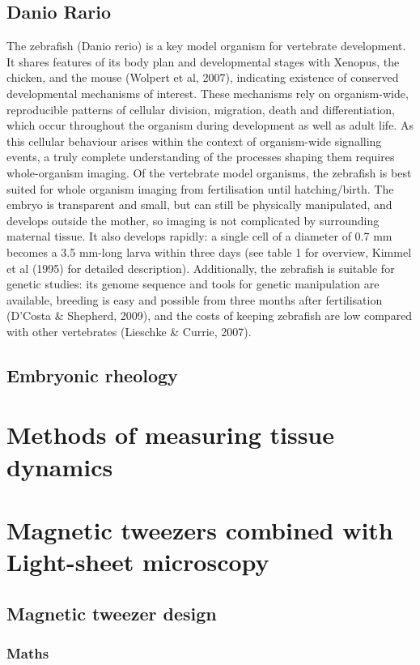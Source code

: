 \subsection{Danio Rario}
The zebrafish (Danio rerio) is a key model organism for vertebrate development.
It shares features of its body plan and developmental stages with Xenopus, the chicken, and the mouse (Wolpert et al, 2007), indicating existence of
conserved developmental mechanisms of interest.
These mechanisms rely on organism-wide, reproducible patterns of cellular division, migration, death and differentiation, which occur throughout the organism during development as well as adult life.
As this cellular behaviour arises within the context of organism-wide signalling events, a truly complete understanding of the processes shaping them
requires whole-organism imaging.
Of the vertebrate model organisms, the zebrafish is best suited for whole organism imaging from fertilisation until hatching/birth. The embryo is transparent and small, but can still be physically manipulated, and develops outside the mother, so imaging is not complicated by surrounding maternal tissue. It also develops rapidly: a single cell of a diameter of 0.7 mm becomes a 3.5 mm-long larva within three days (see table 1 for overview, Kimmel et al (1995) for detailed description).
Additionally, the zebrafish is suitable for genetic studies: its genome sequence and tools for genetic manipulation are available, breeding is easy and possible from three months after fertilisation (D'Costa \& Shepherd, 2009), and the costs of keeping zebrafish are low compared with other vertebrates (Lieschke \& Currie, 2007).
\subsection{Embryonic rheology}
\section{Methods of measuring tissue dynamics}
\section{Magnetic tweezers combined with Light-sheet microscopy}
\subsection{Magnetic tweezer design}
\subsubsection{Maths}
